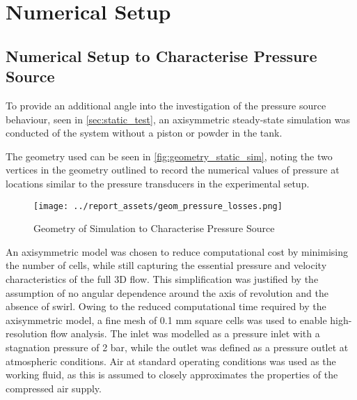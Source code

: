 \section{Numerical Setup}\label{sec:numerical-setup}
\subsection{Numerical Setup to Characterise Pressure Source}
To provide an additional angle into the investigation of the pressure source behaviour, seen in \autoref{sec:static_test}, an axisymmetric steady-state simulation was conducted of the system without a piston or powder in the tank. 

The geometry used can be seen in \autoref{fig:geometry_static_sim}, noting the two vertices in the geometry outlined to record the numerical values of pressure at locations similar to the pressure transducers in the experimental setup.
\begin{figure}[htbp]
    \centering
    
    \begin{minipage}{0.9\textwidth}
        \centering
        \texttt{[image: ../report\_assets/geom\_pressure\_losses.png]}
        \caption{Geometry of Simulation to Characterise Pressure Source}\label{fig:geometry_static_sim}
    \end{minipage}
    
\end{figure}
An axisymmetric model was chosen to reduce computational cost by minimising the number of cells, while still capturing the essential pressure and velocity characteristics of the full 3D flow. This simplification was justified by the assumption of no angular dependence around the axis of revolution and the absence of swirl. Owing to the reduced computational time required by the axisymmetric model, a fine mesh of 0.1 mm square cells was used to enable high-resolution flow analysis. The inlet was modelled as a pressure inlet with a stagnation pressure of 2 bar, while the outlet was defined as a pressure outlet at atmospheric conditions. Air at standard operating conditions was used as the working fluid, as this is assumed to closely approximates the properties of the compressed air supply.
